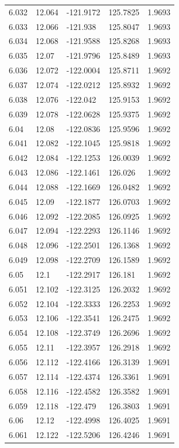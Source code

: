 \begin{tabular}{lllll}
6.032 & 12.064 & -121.9172 & 125.7825 & 1.9693 \\
6.033 & 12.066 & -121.938 & 125.8047 & 1.9693 \\
6.034 & 12.068 & -121.9588 & 125.8268 & 1.9693 \\
6.035 & 12.07 & -121.9796 & 125.8489 & 1.9693 \\
6.036 & 12.072 & -122.0004 & 125.8711 & 1.9692 \\
6.037 & 12.074 & -122.0212 & 125.8932 & 1.9692 \\
6.038 & 12.076 & -122.042 & 125.9153 & 1.9692 \\
6.039 & 12.078 & -122.0628 & 125.9375 & 1.9692 \\
6.04 & 12.08 & -122.0836 & 125.9596 & 1.9692 \\
6.041 & 12.082 & -122.1045 & 125.9818 & 1.9692 \\
6.042 & 12.084 & -122.1253 & 126.0039 & 1.9692 \\
6.043 & 12.086 & -122.1461 & 126.026 & 1.9692 \\
6.044 & 12.088 & -122.1669 & 126.0482 & 1.9692 \\
6.045 & 12.09 & -122.1877 & 126.0703 & 1.9692 \\
6.046 & 12.092 & -122.2085 & 126.0925 & 1.9692 \\
6.047 & 12.094 & -122.2293 & 126.1146 & 1.9692 \\
6.048 & 12.096 & -122.2501 & 126.1368 & 1.9692 \\
6.049 & 12.098 & -122.2709 & 126.1589 & 1.9692 \\
6.05 & 12.1 & -122.2917 & 126.181 & 1.9692 \\
6.051 & 12.102 & -122.3125 & 126.2032 & 1.9692 \\
6.052 & 12.104 & -122.3333 & 126.2253 & 1.9692 \\
6.053 & 12.106 & -122.3541 & 126.2475 & 1.9692 \\
6.054 & 12.108 & -122.3749 & 126.2696 & 1.9692 \\
6.055 & 12.11 & -122.3957 & 126.2918 & 1.9692 \\
6.056 & 12.112 & -122.4166 & 126.3139 & 1.9691 \\
6.057 & 12.114 & -122.4374 & 126.3361 & 1.9691 \\
6.058 & 12.116 & -122.4582 & 126.3582 & 1.9691 \\
6.059 & 12.118 & -122.479 & 126.3803 & 1.9691 \\
6.06 & 12.12 & -122.4998 & 126.4025 & 1.9691 \\
6.061 & 12.122 & -122.5206 & 126.4246 & 1.9691 \\

\end{tabular}
